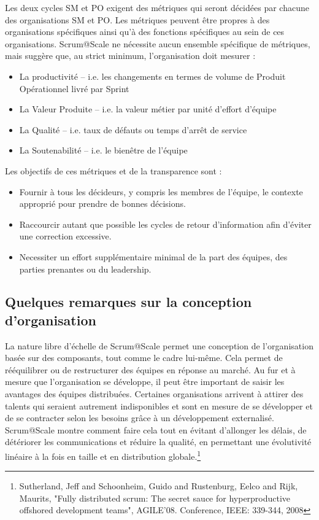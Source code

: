 \documentclass[12pt,a4paper,parskip=full]{scrartcl}
\begin{document}
Les deux cycles SM et PO exigent des métriques qui seront décidées par chacune des
organisations SM et PO. Les métriques peuvent être propres à des organisations
spécifiques ainsi qu'à des fonctions spécifiques au sein de ces organisations.
Scrum@Scale ne nécessite aucun ensemble spécifique de métriques, mais suggère que,
au strict minimum, l'organisation doit mesurer :
\begin{itemize}
\item La productivité – i.e. les changements en termes de volume de Produit
Opérationnel livré par Sprint
\item La Valeur Produite – i.e. la valeur métier par unité d’effort d’équipe
\item La Qualité – i.e. taux de défauts ou temps d’arrêt de service
\item La Soutenabilité – i.e. le bienêtre de l’équipe
\end{itemize}
Les objectifs de ces métriques et de la transparence sont :
\begin{itemize}
  \item Fournir à tous les décideurs, y compris les membres de l'équipe, le contexte
approprié pour prendre de bonnes décisions.
\item Raccourcir autant que possible les cycles de retour d’information afin d'éviter
une correction excessive.
\item Necessiter un effort supplémentaire minimal de la part des équipes, des parties
prenantes ou du leadership.
 \end{itemize}

\subsection{Quelques remarques sur la conception d’organisation}
La nature libre d’échelle de Scrum@Scale permet une conception de l'organisation
basée sur des composants, tout comme le cadre lui-même. Cela permet de
rééquilibrer ou de restructurer des équipes en réponse au marché. Au fur et à mesure
que l'organisation se développe, il peut être important de saisir les avantages des
équipes distribuées. Certaines organisations arrivent à attirer des talents qui seraient
autrement indisponibles et sont en mesure de se développer et de se contracter selon
les besoins grâce à un développement externalisé. Scrum@Scale montre comment
faire cela tout en évitant d’allonger les délais, de détériorer les communications et
réduire la qualité, en permettant une évolutivité linéaire à la fois en taille et en
distribution globale.\footnote{Sutherland, Jeff and Schoonheim,
Guido and Rustenburg, Eelco and Rijk, Maurits, "Fully distributed scrum:
The secret sauce for hyperproductive offshored development teams",
AGILE'08. Conference, IEEE: 339-344, 2008}
\end{document}
